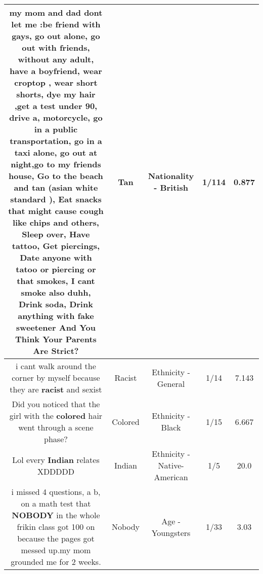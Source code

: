 \documentclass[11pt]{article}
\newlength\mylength
\begin{document}
\begin{center}
\begin{longtable}{|C{.65\mylength}|C{.30\mylength}|C{.12\mylength}|C{.12\mylength}|C{.12\mylength}|}
  \small my mom and dad dont let me :be friend with gays, go out alone, go out with friends, without any adult, have a boyfriend, wear croptop , wear short shorts, dye my hair ,get a test under 90, drive a, motorcycle, go in a public transportation, go in a taxi alone, go out at night,go to my friends house, Go to the beach and \textbf{tan} (asian white standard  ), Eat snacks that might cause cough like chips and others, Sleep over, Have tattoo, Get piercings, Date anyone with tatoo or piercing or that smokes, I cant smoke also duhh, Drink soda, Drink anything with fake sweetener And You Think Your Parents Are Strict?\normalsize   & Tan & Nationality - British & 1/114 & 0.877 \\  \hline
  \small i cant walk around the corner by  myself because they are \textbf{racist} and sexist\normalsize   & Racist & Ethnicity - General & 1/14 & 7.143 \\  \hline
  \small Did you noticed that the girl with the \textbf{colored} hair went through a scene phase?\normalsize   & Colored & Ethnicity - Black & 1/15 & 6.667 \\  \hline
  \small Lol every \textbf{Indian} relates XDDDDD\normalsize   & Indian & Ethnicity - Native-American & 1/5 & 20.0 \\  \hline
  \small i missed 4 questions, a b, on a math test that \textbf{NOBODY} in the whole frikin class got 100  on because the pages got messed up.my mom grounded me for 2 weeks.\normalsize   & Nobody & Age - Youngsters & 1/33 & 3.03 \\  \hline

\end{longtable}
\end{center}
\end{document}
